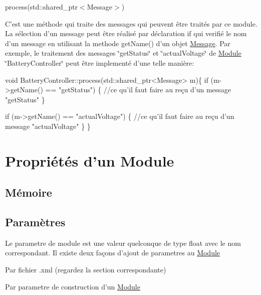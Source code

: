 \begin{DoxyItemize}
\item process(std\-::shared\-\_\-ptr$<$\-Message$>$)

C'est une méthode qui traite des messages qui peuvent être traités par ce module. La sélection d'un message peut être réalisé par déclaration {\ttfamily if} qui verifié le nom d'un message en utilisant la methode {\ttfamily get\-Name()} d'un objet \hyperlink{classMessage}{Message}. Par exemple, le traitement des messages \char`\"{}get\-Status\char`\"{} et \char`\"{}actual\-Voltage\char`\"{} de \hyperlink{classModule}{Module} \char`\"{}\-Battery\-Controller\char`\"{} peut être implementé d'une telle manière\-:


\begin{DoxyCode}
\textcolor{keywordtype}{void} BatteryController::process(std::shared\_ptr<Message> m)\{
    \textcolor{keywordflow}{if} (m->getName() == \textcolor{stringliteral}{"getStatus"}) \{
       \textcolor{comment}{//ce qu'il faut faire au reçu d'un message "getStatus"}
    \}

    \textcolor{keywordflow}{if} (m->getName() == \textcolor{stringliteral}{"actualVoltage"}) \{
        \textcolor{comment}{//ce qu'il faut faire au reçu d'un message "actualVoltage"}
    \}
\}
\end{DoxyCode}

\end{DoxyItemize}\hypertarget{R_xC3_xA9f_xC3_xA9rence_properties}{}\section{Propriétés d'un Module}\label{R_xC3_xA9f_xC3_xA9rence_properties}
\hypertarget{R_xC3_xA9f_xC3_xA9rence_memory}{}\subsection{Mémoire}\label{R_xC3_xA9f_xC3_xA9rence_memory}
\hypertarget{R_xC3_xA9f_xC3_xA9rence_parameters}{}\subsection{Paramètres}\label{R_xC3_xA9f_xC3_xA9rence_parameters}
Le parametre de module est une valeur quelconque de type float avec le nom correspondant. Il existe deux façons d'ajout de parametres au \hyperlink{classModule}{Module}
\begin{DoxyItemize}
\item Par fichier .xml (regardez la section correspondante)
\item Par parametre de construction d'un \hyperlink{classModule}{Module}
\end{DoxyItemize}


